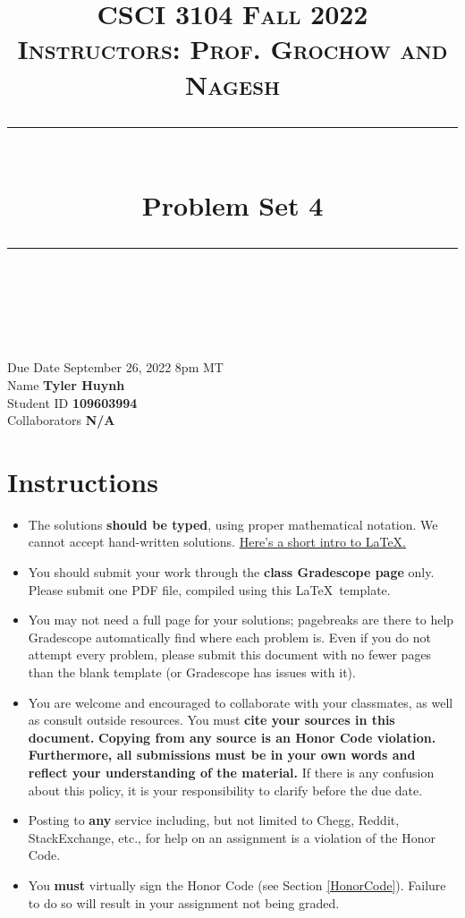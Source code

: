 \documentclass[11pt]{article}
\title{
\normalfont \normalsize 
\textsc{CSCI 3104 Fall 2022 \\ 
Instructors: Prof. Grochow and Nagesh} \\
[10pt] 
\rule{\linewidth}{0.5pt} \\[6pt] 
\huge Problem Set 4 \\
\rule{\linewidth}{2pt}  \\[10pt]
}
\date{}
\theoremstyle{definition}
\theoremstyle{definition}
\theoremstyle{definition}
\begin{document}

\maketitle


\noindent
Due Date \dotfill September 26, 2022 8pm MT\\
Name \dotfill \textbf{Tyler Huynh} \\
Student ID \dotfill \textbf{109603994} \\
Collaborators \dotfill \textbf{N/A}

\tableofcontents

\section*{Instructions}
 \begin{itemize}
	\item The solutions \textbf{should be typed}, using proper mathematical notation. We cannot accept hand-written solutions. \href{http://ece.uprm.edu/~caceros/latex/introduction.pdf}{Here's a short intro to \LaTeX.}
	\item You should submit your work through the \textbf{class Gradescope page} only. Please submit one PDF file, compiled using this \LaTeX \ template.
	\item You may not need a full page for your solutions; pagebreaks are there to help Gradescope automatically find where each problem is. Even if you do not attempt every problem, please submit this document with no fewer pages than the blank template (or Gradescope has issues with it).

	\item You are welcome and encouraged to collaborate with your classmates, as well as consult outside resources. You must \textbf{cite your sources in this document.} \textbf{Copying from any source is an Honor Code violation. Furthermore, all submissions must be in your own words and reflect your understanding of the material.} If there is any confusion about this policy, it is your responsibility to clarify before the due date. 

	\item Posting to \textbf{any} service including, but not limited to Chegg, Reddit, StackExchange, etc., for help on an assignment is a violation of the Honor Code.

	\item You \textbf{must} virtually sign the Honor Code (see Section \ref{HonorCode}). Failure to do so will result in your assignment not being graded.
\end{itemize}
\end{document}
